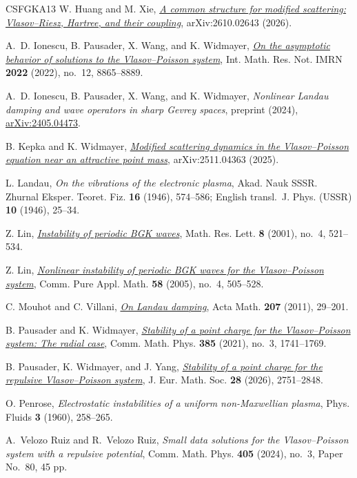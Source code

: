 \documentclass[10pt,reqno]{amsart}
\begin{document}
\begin{thebibliography}{CSFGKA13}
W. Huang and M. Xie,
\href{https://arxiv.org/abs/2610.02643}{\emph{A common structure for modified scattering: Vlasov--Riesz, Hartree, and their coupling}},
arXiv:2610.02643 (2026).

A.~D. Ionescu, B. Pausader, X. Wang, and K. Widmayer,
\href{https://doi.org/10.1093/imrn/rnab155}{\emph{On the asymptotic behavior of solutions to the Vlasov--Poisson system}},
Int. Math. Res. Not. IMRN \textbf{2022} (2022), no.~12, 8865--8889.

A.~D. Ionescu, B. Pausader, X. Wang, and K. Widmayer,
\emph{Nonlinear Landau damping and wave operators in sharp Gevrey spaces},
preprint (2024), \href{https://arxiv.org/abs/2405.04473}{arXiv:2405.04473}.

B. Kepka and K. Widmayer,
\href{https://arxiv.org/abs/2511.04363}{\emph{Modified scattering dynamics in the Vlasov--Poisson equation near an attractive point mass}},
arXiv:2511.04363 (2025).

L. Landau,
\emph{On the vibrations of the electronic plasma},
Akad. Nauk SSSR. Zhurnal Eksper. Teoret. Fiz. \textbf{16} (1946), 574--586; English transl.\ J. Phys. (USSR) \textbf{10} (1946), 25--34.

Z. Lin,
\href{https://link.intlpress.com/JDetail/1806606498308452354}{\emph{Instability of periodic BGK waves}},
Math. Res. Lett. \textbf{8} (2001), no.~4, 521--534.

Z. Lin,
\href{https://onlinelibrary.wiley.com/doi/abs/10.1002/cpa.20028}{\emph{Nonlinear instability of periodic BGK waves for the Vlasov--Poisson system}},
Comm. Pure Appl. Math. \textbf{58} (2005), no.~4, 505--528.

C. Mouhot and C. Villani,
\href{https://projecteuclid.org/journals/acta-mathematica/volume-207/issue-1/On-Landau-damping/10.1007/s11511-011-0068-9.full}{\emph{On Landau damping}},
Acta Math. \textbf{207} (2011), 29--201.

B. Pausader and K. Widmayer,
\href{https://link.springer.com/article/10.1007/s00220-021-04117-8}{\emph{Stability of a point charge for the Vlasov--Poisson system: The radial case}},
Comm. Math. Phys. \textbf{385} (2021), no.~3, 1741--1769.

B. Pausader, K. Widmayer, and J. Yang,
\href{https://doi.org/10.4171/JEMS/1518}{\emph{Stability of a point charge for the repulsive Vlasov--Poisson system}},
J. Eur. Math. Soc. \textbf{28} (2026), 2751--2848.

O. Penrose,
\emph{Electrostatic instabilities of a uniform non-Maxwellian plasma},
Phys. Fluids \textbf{3} (1960), 258--265.

A.~Velozo Ruiz and R.~Velozo Ruiz,
\emph{Small data solutions for the Vlasov--Poisson system with a repulsive potential},
Comm. Math. Phys. \textbf{405} (2024), no.~3, Paper No.~80, 45 pp.
\end{thebibliography}
\endgroup
\end{document}
